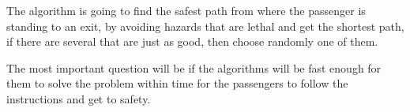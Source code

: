 The algorithm is going to find the safest path from where the passenger is standing to an exit, by avoiding hazards that are lethal and get the shortest path, if there are several that are just as good, then choose randomly one of them.

The most important question will be if the algorithms will be fast enough for them to solve the problem within time for the passengers to follow the instructions and get to safety.


 

